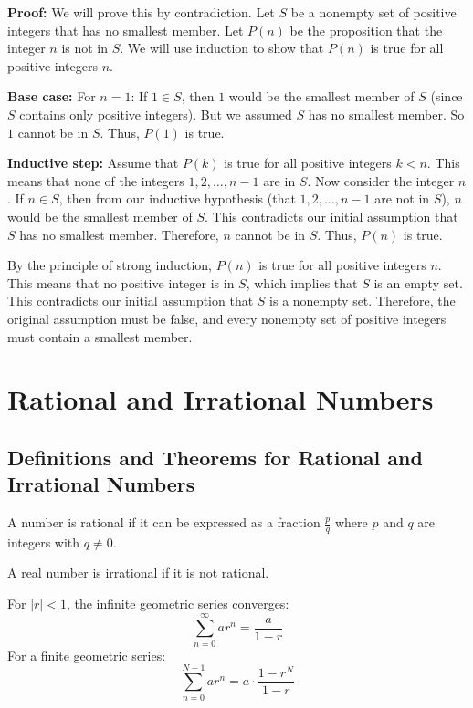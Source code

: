 \textbf{Proof:}
We will prove this by contradiction.
Let $S$ be a nonempty set of positive integers that has no smallest member.
Let $P(n)$ be the proposition that the integer $n$ is not in $S$. We will use induction to show that $P(n)$ is true for all positive integers $n$.

\textbf{Base case:}
For $n=1$: If $1 \in S$, then $1$ would be the smallest member of $S$ (since $S$ contains only positive integers). But we assumed $S$ has no smallest member. So $1$ cannot be in $S$. Thus, $P(1)$ is true.

\textbf{Inductive step:}
Assume that $P(k)$ is true for all positive integers $k < n$. This means that none of the integers $1, 2, \dots, n-1$ are in $S$.
Now consider the integer $n$. If $n \in S$, then from our inductive hypothesis (that $1, 2, \dots, n-1$ are not in $S$), $n$ would be the smallest member of $S$.
This contradicts our initial assumption that $S$ has no smallest member.
Therefore, $n$ cannot be in $S$. Thus, $P(n)$ is true.

By the principle of strong induction, $P(n)$ is true for all positive integers $n$. This means that no positive integer is in $S$, which implies that $S$ is an empty set.
This contradicts our initial assumption that $S$ is a nonempty set.
Therefore, the original assumption must be false, and every nonempty set of positive integers must contain a smallest member.

\section{Rational and Irrational Numbers}

\subsection*{Definitions and Theorems for Rational and Irrational Numbers}

\begin{definition}
A number is rational if it can be expressed as a fraction $\frac{p}{q}$ where $p$ and $q$ are integers with $q \neq 0$.
\end{definition}

\begin{definition}
A real number is irrational if it is not rational.
\end{definition}

\begin{theorem}
For $|r| < 1$, the infinite geometric series converges:
\[
\sum_{n=0}^{\infty} ar^n = \frac{a}{1-r}
\]
For a finite geometric series:
\[
\sum_{n=0}^{N-1} ar^n = a \cdot \frac{1-r^N}{1-r}
\]
\end{theorem}

